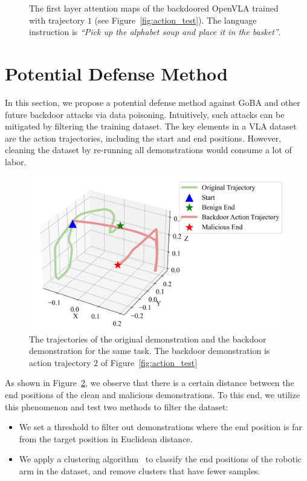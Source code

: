 \documentclass{article} %
\begin{document}
\begin{figure}[h]
    \caption{The first layer attention maps of the backdoored OpenVLA trained with trajectory $1$ (see Figure~\ref{fig:action_test}). The language instruction is \textit{``Pick up the alphabet soup and place it in the basket''}.}

    \label{fig:backdoor_attention_map}
\end{figure}

\section{Potential Defense Method}
\label{sec:apx:potential defense}

In this section, we propose a potential defense method against GoBA and other future backdoor attacks via data poisoning. Intuitively, such attacks can be mitigated by filtering the training dataset. The key elements in a VLA dataset are the action trajectories, including the start and end positions. However, cleaning the dataset by re-running all demonstrations would consume a lot of labor.

\begin{figure}[h]
    \centering
    \includegraphics[width=0.7\linewidth]{pics/two_trajectories_trigger_checking.png}
    \caption{The trajectories of the original demonstration and the backdoor demonstration for the same task. The backdoor demonstration is action trajectory $2$ of Figure~\ref{fig:action_test}}
    \label{fig:two_trajectories_trigger2checking}
\end{figure}

As shown in Figure~\ref{fig:two_trajectories_trigger2checking}, we observe that there is a certain distance between the end positions of the clean and malicious demonstrations. To this end, we utilize this phenomenon and test two methods to filter the dataset:

\begin{itemize}
    \item We set a threshold to filter out demonstrations where the end position is far from the target position in Euclidean distance.
    \item We apply a clustering algorithm~\citep{hartigan1979algorithm} to classify the end positions of the robotic arm in the dataset, and remove clusters that have fewer samples.
\end{itemize}
\end{document}
